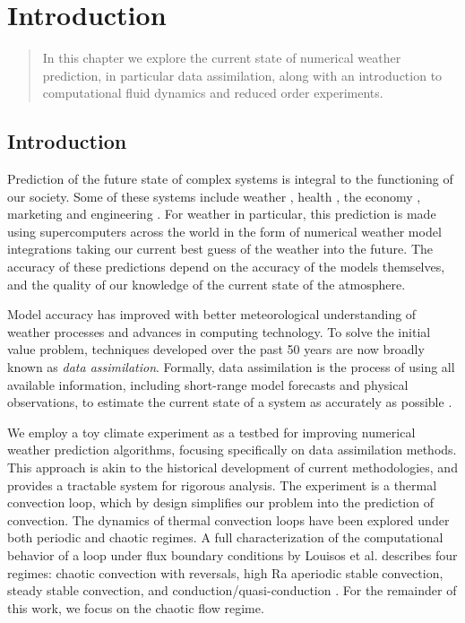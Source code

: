 \chapter{Introduction}

\begin{quote}
In this chapter we explore the current state of numerical weather prediction, in particular data assimilation, along with an introduction to computational fluid dynamics and reduced order experiments.
\end{quote}

\section{Introduction}

Prediction of the future state of complex systems is integral to the functioning of our society.
Some of these systems include weather , health , the economy , marketing  and engineering .
For weather in particular, this prediction is made using supercomputers across the world in the form of numerical weather model integrations taking our current best guess of the weather into the future.
The accuracy of these predictions depend on the accuracy of the models themselves, and the quality of our knowledge of the current state of the atmosphere.

Model accuracy has improved with better meteorological understanding of weather processes and advances in computing technology.
To solve the initial value problem, techniques developed over the past 50 years are now broadly known as {\em data assimilation}.
Formally, data assimilation is the process of using all available information, including short-range model forecasts and physical observations, to estimate the current state of a system as accurately as possible .

We employ a toy climate experiment as a testbed for improving numerical weather prediction algorithms, focusing specifically on data assimilation methods.
This approach is akin to the historical development of current methodologies, and provides a tractable system for rigorous analysis.
The experiment is a thermal convection loop, which by design simplifies our problem into the prediction of convection.
The dynamics of thermal convection loops have been explored under both periodic  and chaotic  regimes.
A full characterization of the computational behavior of a loop under flux boundary conditions by Louisos et al. describes four regimes: chaotic convection with reversals, high Ra aperiodic stable convection, steady stable convection, and conduction/quasi-conduction .
For the remainder of this work, we focus on the chaotic flow regime.

